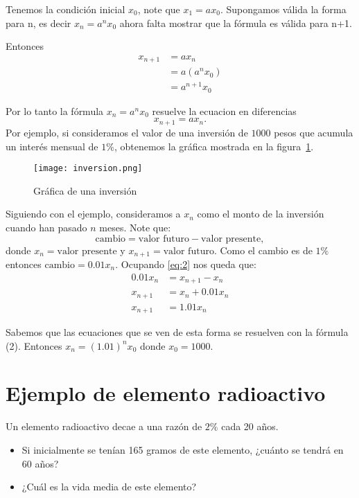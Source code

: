 \documentclass{report}
\begin{document}
Tenemos la condición inicial $x_0$, note que $x_1=ax_0$.  Supongamos
válida la forma para n, es decir $x_n=a^nx_0$ ahora falta mostrar que
la fórmula es válida para n+1.

Entonces
\begin{align*}
  x_{n+1}&=ax_n\\
        &=a(a^nx_0)\\
       &=a^{n+1}x_0
\end{align*}

Por lo tanto la fórmula $x_n=a^nx_0$ resuelve la ecuacion en
diferencias $$x_{n+1}=ax_n.$$
Por ejemplo, si consideramos el valor de una inversión de $1000$ pesos
que acumula un interés mensual de $1\%$, obtenemos la gráfica mostrada
en la figura~\ref{inversion}.

\begin{figure}
  \centering
  \texttt{[image: inversion.png]}
  \caption{Gráfica de una inversión}
  \label{inversion}
\end{figure}

Siguiendo con el ejemplo, consideramos a $x_n$ como el monto
de la inversión cuando han pasado $n$ meses.  Note que:
\begin{equation}
  \label{eq:2}
  \text{cambio}=\text{valor futuro}-\text{valor presente},
\end{equation}
donde $x_n=\text{valor presente}$ y $x_{n+1}=\text{valor futuro}$.
Como el cambio es de $1\%$ entonces $\text{cambio}=0.01x_n$.  Ocupando
\eqref{eq:2} nos queda que:
\begin{align*}
  0.01x_n&=x_{n+1}-x_n\\
  x_{n+1}&=x_n+0.01x_n\\
 x_{n+1}&=1.01x_n
\end{align*}

Sabemos que las ecuaciones que se ven de esta forma se resuelven con
la fórmula (2).  Entonces $x_n=(1.01)^nx_0$ donde $x_0=1000$.

\section{Ejemplo de elemento radioactivo}

Un elemento radioactivo decae a una razón de $2\%$ cada 20 años.
\begin{itemize}
\item Si inicialmente se tenían 165 gramos de este elemento, ¿cuánto
  se tendrá en 60 años?
 \item ¿Cuál es la vida media de este elemento?
\end{itemize}
\end{document}
